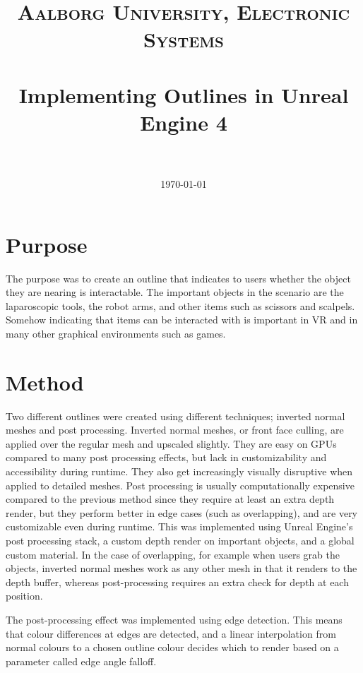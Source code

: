 \documentclass[paper=a4, fontsize=11pt]{scrartcl} %
\title{	
\normalfont \normalsize 
\textsc{Aalborg University, Electronic Systems} \\ [25pt] %
\horrule{0.5pt} \\[0.4cm] %
\huge Implementing Outlines in Unreal Engine 4 \\ %
\horrule{2pt} \\[0.5cm] %
}
\date{\normalsize\today} %
\numberwithin{equation}{section} %
\numberwithin{figure}{section} %
\numberwithin{table}{section} %
\begin{document}
\maketitle %


\section{Purpose}
The purpose was to create an outline that indicates to users whether the object they are nearing is interactable. The important objects in the scenario are the laparoscopic tools, the robot arms, and other items such as scissors and scalpels. Somehow indicating that items can be interacted with is important in VR and in many other graphical environments such as games.

\section{Method}
Two different outlines were created using different techniques; inverted normal meshes and post processing. Inverted normal meshes, or front face culling, are applied over the regular mesh and upscaled slightly. They are easy on GPUs compared to many post processing effects, but lack in customizability and accessibility during runtime. They also get increasingly visually disruptive when applied to detailed meshes. Post processing is usually computationally expensive compared to the previous method since they require at least an extra depth render, but they perform better in edge cases (such as overlapping), and are very customizable even during runtime. This was implemented using Unreal Engine's post processing stack, a custom depth render on important objects, and a global custom material. In the case of overlapping, for example when users grab the objects, inverted normal meshes work as any other mesh in that it renders to the depth buffer, whereas post-processing requires an extra check for depth at each position.

The post-processing effect was implemented using edge detection. This means that colour differences at edges are detected, and a linear interpolation from normal colours to a chosen outline colour decides which to render based on a parameter called edge angle falloff.
\end{document}
